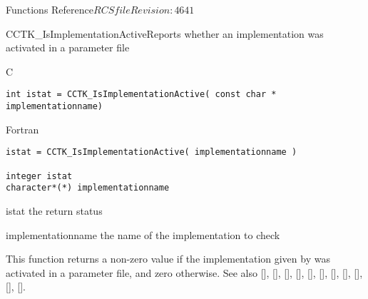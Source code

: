 \begin{cactuspart}{ Functions Reference}{$RCSfile$}{$Revision: 4641 $}
\begin{FunctionDescription}{CCTK\_IsImplementationActive}{Reports whether an implementation was activated in a parameter file}
\label{CCTK-IsImplementationActive}
\begin{SynopsisSection}
\begin{Synopsis}{C}
\begin{verbatim}int istat = CCTK_IsImplementationActive( const char * implementationname)\end{verbatim}
\end{Synopsis}
\begin{Synopsis}{Fortran}
\begin{verbatim}istat = CCTK_IsImplementationActive( implementationname )

integer istat
character*(*) implementationname \end{verbatim}
\end{Synopsis}
\end{SynopsisSection}
\begin{ParameterSection}
\begin{Parameter}{istat}
the return status
\end{Parameter}
\begin{Parameter}{implementationname}
the name of the implementation to check
\end{Parameter}
\end{ParameterSection}
\begin{Discussion}
This function returns a non-zero value if the implementation given by
 was activated in a parameter file, and zero
otherwise.
See also
 [\pageref{CCTK-ActivatingThorn}],
 [\pageref{CCTK-CompiledImplementation}],
 [\pageref{CCTK-CompiledThorn}],
 [\pageref{CCTK-ImplementationRequires}],
 [\pageref{CCTK-ImplementationThorn}],
 [\pageref{CCTK-ImpThornList}],
 [\pageref{CCTK-IsImplementationCompiled}],
 [\pageref{CCTK-IsThornActive}],
 [\pageref{CCTK-NumCompiledImplementations}],
 [\pageref{CCTK-NumCompiledThorns}],
 [\pageref{CCTK-ThornImplementation}].
\end{Discussion}
\end{FunctionDescription}


\end{cactuspart}
